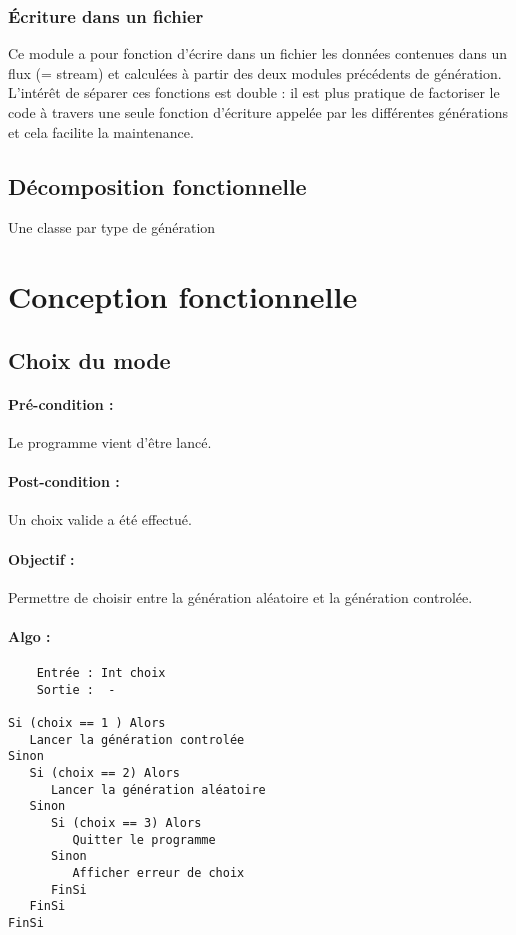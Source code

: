 			\subsubsection{Écriture dans un fichier}
				Ce module a pour fonction d’écrire dans un fichier les données contenues dans un flux (= stream)  et calculées à partir des deux modules précédents de génération. L’intérêt de séparer ces fonctions est double : il est plus pratique de factoriser le code à travers une seule fonction d’écriture appelée par les différentes générations et cela facilite la maintenance.


		\subsection{Décomposition fonctionnelle}
			Une classe par type de génération 


	\section{Conception fonctionnelle}

		\subsection{Choix du mode}
			\paragraph{Pré-condition :} Le programme vient d’être lancé.
			\paragraph{Post-condition :} Un choix valide a été effectué.
			\paragraph{Objectif :} Permettre de choisir entre la génération aléatoire et la génération controlée.
			\paragraph{Algo :}
			\begin{verbatim} 
	Entrée : Int choix
	Sortie :  -

Si (choix == 1 ) Alors
   Lancer la génération controlée
Sinon
   Si (choix == 2) Alors
	  Lancer la génération aléatoire 
   Sinon
	  Si (choix == 3) Alors
	     Quitter le programme
	  Sinon
	     Afficher erreur de choix 
	  FinSi
   FinSi
FinSi
		\end{verbatim} 

